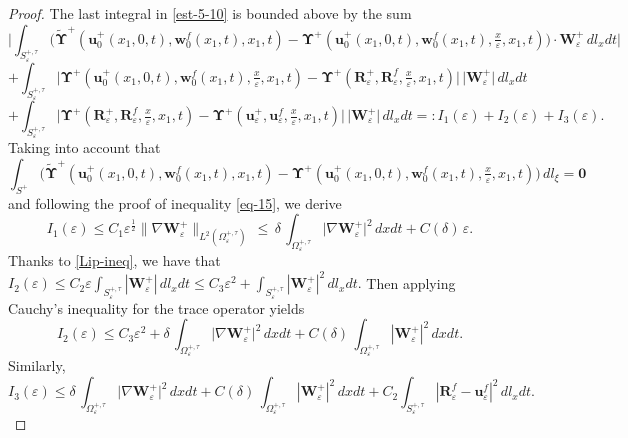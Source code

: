 \documentclass[reqno]{amsart}            %
\numberwithin{equation}{section}
\begin{document}
\begin{proof}
		The last integral in \eqref{est-5-10} is bounded above by the sum
		$$
		\bigg|\int_{S_\varepsilon^{+, \tau}} \big(\widetilde{\boldsymbol{\Upsilon}}^+(\mathbf{u}^+_0(x_1,0,t), \mathbf{w}^f_0(x_1,t), x_1, t) -  \boldsymbol{\Upsilon}^+(\mathbf{u}^+_0(x_1,0,t), \mathbf{w}^f_0(x_1,t), \tfrac{x}{\varepsilon}, x_1, t)\big) \cdot \mathbf{W}^+_\varepsilon \, dl_xdt\bigg|
		$$
		$$ 
		+ \int_{S_\varepsilon^{+, \tau}} \big|\boldsymbol{\Upsilon}^+(\mathbf{u}^+_0(x_1,0,t), \mathbf{w}^f_0(x_1,t), \tfrac{x}{\varepsilon}, x_1, t) - \boldsymbol{\Upsilon}^+(\mathbf{R}^+_\varepsilon, \mathbf{R}^f_\varepsilon, \tfrac{x}{\varepsilon}, x_1, t)\big| \, \big|\mathbf{W}^+_\varepsilon\big| \, dl_xdt
		$$
		$$
		+ \int_{S_\varepsilon^{+, \tau}} \big|\boldsymbol{\Upsilon}^+(\mathbf{R}^+_\varepsilon, \mathbf{R}^f_\varepsilon, \tfrac{x}{\varepsilon}, x_1, t) - \boldsymbol{\Upsilon}^+(\mathbf{u}_\varepsilon^+, \mathbf{u}_\varepsilon^f, \tfrac{x}{\varepsilon}, x_1, t)\big| \, \big|\mathbf{W}^+_\varepsilon\big| \, dl_xdt =: I_1(\varepsilon) + I_2(\varepsilon) + I_3(\varepsilon) .
		$$
		Taking into account that
		$$
		\int_{S^{+}} \big(\widetilde{\boldsymbol{\Upsilon}}^+(\mathbf{u}^+_0(x_1,0,t), \mathbf{w}^f_0(x_1,t), x_1, t) -  \boldsymbol{\Upsilon}^+(\mathbf{u}^+_0(x_1,0,t), \mathbf{w}^f_0(x_1,t), \tfrac{x}{\varepsilon}, x_1, t)\big)  \, dl_\xi = \mathbf{0}
		$$
		and following the proof of inequality \eqref{eq-15}, we derive
		$$
		I_1(\varepsilon) \le C_1 \varepsilon^\frac{1}{2} \|\nabla\mathbf{W}^+_\varepsilon\|_{L^2(\Omega_\varepsilon^{+, \tau})} \,\le \, \delta \, \int_{\Omega_\varepsilon^{+, \tau}} \big|\nabla\mathbf{W}^+_\varepsilon\big|^2 \, dxdt + C(\delta)\, \varepsilon .
		$$
		Thanks to \eqref{Lip-ineq}, we have that $I_2(\varepsilon) \le C_2 \varepsilon \int_{S_\varepsilon^{+, \tau}} |\mathbf{W}^+_\varepsilon| \, dl_xdt \le C_3 \varepsilon^2 + \int_{S_\varepsilon^{+, \tau}} |\mathbf{W}^+_\varepsilon|^2 \, dl_xdt.$ Then applying Cauchy's inequality for the trace operator yields 
		$$
		I_2(\varepsilon) \le 
		C_3 \varepsilon^2 + \delta \, \int_{\Omega_\varepsilon^{+, \tau}} \big|\nabla\mathbf{W}^+_\varepsilon\big|^2 \, dxdt + C(\delta)\, 
		\int_{\Omega_\varepsilon^{+, \tau}} |\mathbf{W}^+_\varepsilon|^2 \, dxdt.
		$$ 
		Similarly,
		$$
		I_3(\varepsilon) \le 
		\delta \, \int_{\Omega_\varepsilon^{+, \tau}} \big|\nabla\mathbf{W}^+_\varepsilon\big|^2 \, dxdt + C(\delta)\, 
		\int_{\Omega_\varepsilon^{+, \tau}} |\mathbf{W}^+_\varepsilon|^2 \, dxdt + C_2 \int_{S_\varepsilon^{+, \tau}} |\mathbf{R}^f_\varepsilon - \mathbf{u}^f_\varepsilon|^2 \, dl_xdt.
		$$ 
		\smallskip 
		

\end{proof}
\end{document}
